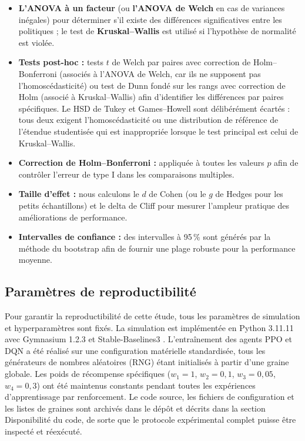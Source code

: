 \documentclass[11pt,a4paper]{article}
\begin{document}
\begin{itemize}
  \item \textbf{L'ANOVA à un facteur} (ou \textbf{l'ANOVA de Welch} en cas de variances inégales) pour déterminer s'il existe des différences significatives entre les politiques ; le test de \textbf{Kruskal--Wallis} est utilisé si l'hypothèse de normalité est violée.
  \item \textbf{Tests post-hoc :} tests $t$ de Welch par paires avec correction de Holm--Bonferroni (associés à l'ANOVA de Welch, car ils ne supposent pas l'homoscédasticité) ou test de Dunn fondé sur les rangs avec correction de Holm (associé à Kruskal--Wallis) afin d'identifier les différences par paires spécifiques. Le HSD de Tukey et Games--Howell sont délibérément écartés : tous deux exigent l'homoscédasticité ou une distribution de référence de l'étendue studentisée qui est inappropriée lorsque le test principal est celui de Kruskal--Wallis.
  \item \textbf{Correction de Holm--Bonferroni :} appliquée à toutes les valeurs $p$ afin de contrôler l'erreur de type I dans les comparaisons multiples.
  \item \textbf{Taille d'effet :} nous calculons le $d$ de Cohen (ou le $g$ de Hedges pour les petits échantillons) et le delta de Cliff pour mesurer l'ampleur pratique des améliorations de performance.
  \item \textbf{Intervalles de confiance :} des intervalles à 95\,\% sont générés par la méthode du bootstrap afin de fournir une plage robuste pour la performance moyenne.
\end{itemize}

\subsection{Paramètres de reproductibilité}

Pour garantir la reproductibilité de cette étude, tous les paramètres de simulation et hyperparamètres sont fixés. La simulation est implémentée en Python 3.11.11 avec Gymnasium 1.2.3 \cite{MarkTowers2025} et Stable-Baselines3 \cite{AntoninRaffin2021}. L'entraînement des agents PPO et DQN a été réalisé sur une configuration matérielle standardisée, tous les générateurs de nombres aléatoires (RNG) étant initialisés à partir d'une graine globale. Les poids de récompense spécifiques ($w_1 = 1$, $w_2 = 0{,}1$, $w_3 = 0{,}05$, $w_4 = 0{,}3$) ont été maintenus constants pendant toutes les expériences d'apprentissage par renforcement. Le code source, les fichiers de configuration et les listes de graines sont archivés dans le dépôt et décrits dans la section Disponibilité du code, de sorte que le protocole expérimental complet puisse être inspecté et réexécuté.
\end{document}
